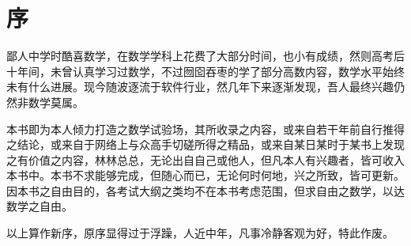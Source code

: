 
\chapter*{序}

鄙人中学时酷喜数学，在数学学科上花费了大部分时间，也小有成绩，然则高考后十年间，未曾认真学习过数学，不过囫囵吞枣的学了部分高数内容，数学水平始终未有什么进展。现今随波逐流于软件行业，然几年下来逐渐发现，吾人最终兴趣仍然非数学莫属。

本书即为本人倾力打造之数学试验场，其所收录之内容，或来自若干年前自行推得之结论，或来自于网络上与众高手切磋所得之精品，或来自某日某时于某书上发现之有价值之内容，林林总总，无论出自自己或他人，但凡本人有兴趣者，皆可收入本书中。本书不求能够完成，但随心而已，无论何时何地，兴之所致，皆可更新。因本书之自由目的，各考试大纲之类均不在本书考虑范围，但求自由之数学，以达数学之自由。

以上算作新序，原序显得过于浮躁，人近中年，凡事冷静客观为好，特此作废。

